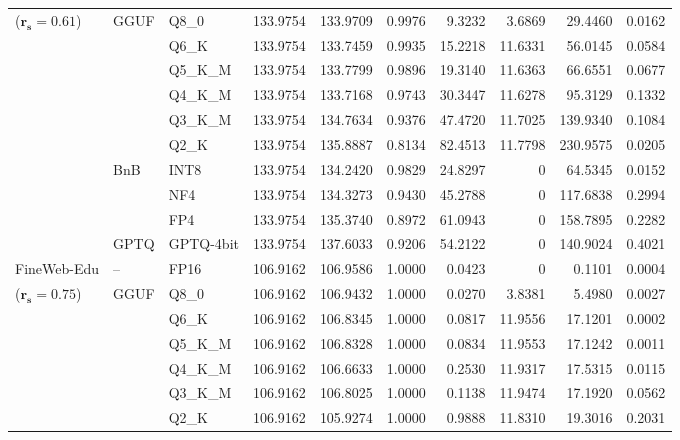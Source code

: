 \begin{table}[t]
{\begin{tabular}{ll l rrrrrrr}
{\small ($\mathbf{r_s{=}0.61}$)} & GGUF & Q8\_0 & 133.9754 & 133.9709 & 0.9976 & 9.3232 & 3.6869 & 29.4460 & 0.0162 \\
 &  & Q6\_K & 133.9754 & 133.7459 & 0.9935 & 15.2218 & 11.6331 & 56.0145 & 0.0584 \\
 &  & Q5\_K\_M & 133.9754 & 133.7799 & 0.9896 & 19.3140 & 11.6363 & 66.6551 & 0.0677 \\
 &  & Q4\_K\_M & 133.9754 & 133.7168 & 0.9743 & 30.3447 & 11.6278 & 95.3129 & 0.1332 \\
 &  & Q3\_K\_M & 133.9754 & 134.7634 & \cellcolor{red!18} 0.9376 & \cellcolor{red!18} 47.4720 & 11.7025 & \cellcolor{red!18} 139.9340 & \cellcolor{red!18} 0.1084 \\
 &  & Q2\_K & 133.9754 & 135.8887 & \cellcolor{red!18} 0.8134 & \cellcolor{red!18} 82.4513 & 11.7798 & \cellcolor{red!18} 230.9575 & \cellcolor{red!18} 0.0205 \\
 & BnB & INT8 & 133.9754 & 134.2420 & 0.9829 & 24.8297 & \cellcolor{cyan!12} $0$ & 64.5345 & 0.0152 \\
 &  & NF4 & 133.9754 & 134.3273 & \cellcolor{red!18} 0.9430 & \cellcolor{red!18} 45.2788 & \cellcolor{cyan!12} $0$ & \cellcolor{red!18} 117.6838 & \cellcolor{red!18} 0.2994 \\
 &  & FP4 & 133.9754 & 135.3740 & \cellcolor{red!18} 0.8972 & \cellcolor{red!18} 61.0943 & \cellcolor{cyan!12} $0$ & \cellcolor{red!18} 158.7895 & \cellcolor{red!18} 0.2282 \\
 & GPTQ & GPTQ-4bit & 133.9754 & 137.6033 & \cellcolor{red!18} 0.9206 & \cellcolor{red!18} 54.2122 & \cellcolor{cyan!12} $0$ & \cellcolor{red!18} 140.9024 & \cellcolor{red!18} 0.4021 \\
\midrule
FineWeb-Edu & -- & FP16 & 106.9162 & 106.9586 & 1.0000 & 0.0423 & \cellcolor{cyan!12} $0$ & 0.1101 & 0.0004 \\
{\small ($\mathbf{r_s{=}0.75}$)} & GGUF & Q8\_0 & 106.9162 & 106.9432 & 1.0000 & 0.0270 & 3.8381 & 5.4980 & 0.0027 \\
 &  & Q6\_K & 106.9162 & 106.8345 & 1.0000 & 0.0817 & 11.9556 & 17.1201 & 0.0002 \\
 &  & Q5\_K\_M & 106.9162 & 106.8328 & 1.0000 & 0.0834 & 11.9553 & 17.1242 & 0.0011 \\
 &  & Q4\_K\_M & 106.9162 & 106.6633 & 1.0000 & 0.2530 & 11.9317 & 17.5315 & 0.0115 \\
 &  & Q3\_K\_M & 106.9162 & 106.8025 & 1.0000 & 0.1138 & 11.9474 & 17.1920 & 0.0562 \\
 &  & Q2\_K & 106.9162 & 105.9274 & 1.0000 & 0.9888 & 11.8310 & 19.3016 & 0.2031 \\

\end{tabular}}
\end{table}
